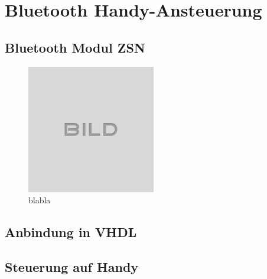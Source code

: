
\chapter{Bluetooth Handy-Ansteuerung}\label{chap.bluetooth}

\section{Bluetooth Modul ZSN}\label{sect.bluetooth_modul}

\begin{figure}[H]
	\centering
	\includegraphics[width=0.5\textwidth]{images/idle.png}
	\caption{blabla}
	\label{fig.bluetooth_}
\end{figure}


\section{Anbindung in VHDL}\label{sect.bluetooth_vhdl}



\section{Steuerung auf Handy}\label{sect.bluetooth_handy}